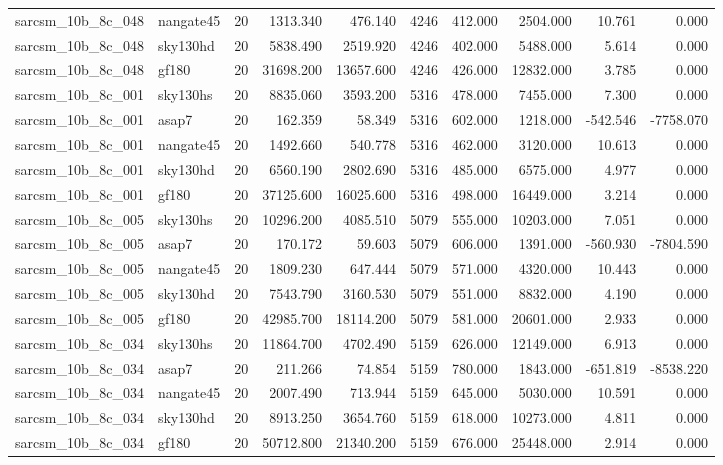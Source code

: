 \begin{longtable}{llrrrrrrrr}
sarcsm\_10b\_8c\_048 & nangate45 & 20 & 1313.340 & 476.140 & 4246 & 412.000 & 2504.000 & 10.761 & 0.000 \\
sarcsm\_10b\_8c\_048 & sky130hd & 20 & 5838.490 & 2519.920 & 4246 & 402.000 & 5488.000 & 5.614 & 0.000 \\
sarcsm\_10b\_8c\_048 & gf180 & 20 & 31698.200 & 13657.600 & 4246 & 426.000 & 12832.000 & 3.785 & 0.000 \\
sarcsm\_10b\_8c\_001 & sky130hs & 20 & 8835.060 & 3593.200 & 5316 & 478.000 & 7455.000 & 7.300 & 0.000 \\
sarcsm\_10b\_8c\_001 & asap7 & 20 & 162.359 & 58.349 & 5316 & 602.000 & 1218.000 & -542.546 & -7758.070 \\
sarcsm\_10b\_8c\_001 & nangate45 & 20 & 1492.660 & 540.778 & 5316 & 462.000 & 3120.000 & 10.613 & 0.000 \\
sarcsm\_10b\_8c\_001 & sky130hd & 20 & 6560.190 & 2802.690 & 5316 & 485.000 & 6575.000 & 4.977 & 0.000 \\
sarcsm\_10b\_8c\_001 & gf180 & 20 & 37125.600 & 16025.600 & 5316 & 498.000 & 16449.000 & 3.214 & 0.000 \\
sarcsm\_10b\_8c\_005 & sky130hs & 20 & 10296.200 & 4085.510 & 5079 & 555.000 & 10203.000 & 7.051 & 0.000 \\
sarcsm\_10b\_8c\_005 & asap7 & 20 & 170.172 & 59.603 & 5079 & 606.000 & 1391.000 & -560.930 & -7804.590 \\
sarcsm\_10b\_8c\_005 & nangate45 & 20 & 1809.230 & 647.444 & 5079 & 571.000 & 4320.000 & 10.443 & 0.000 \\
sarcsm\_10b\_8c\_005 & sky130hd & 20 & 7543.790 & 3160.530 & 5079 & 551.000 & 8832.000 & 4.190 & 0.000 \\
sarcsm\_10b\_8c\_005 & gf180 & 20 & 42985.700 & 18114.200 & 5079 & 581.000 & 20601.000 & 2.933 & 0.000 \\
sarcsm\_10b\_8c\_034 & sky130hs & 20 & 11864.700 & 4702.490 & 5159 & 626.000 & 12149.000 & 6.913 & 0.000 \\
sarcsm\_10b\_8c\_034 & asap7 & 20 & 211.266 & 74.854 & 5159 & 780.000 & 1843.000 & -651.819 & -8538.220 \\
sarcsm\_10b\_8c\_034 & nangate45 & 20 & 2007.490 & 713.944 & 5159 & 645.000 & 5030.000 & 10.591 & 0.000 \\
sarcsm\_10b\_8c\_034 & sky130hd & 20 & 8913.250 & 3654.760 & 5159 & 618.000 & 10273.000 & 4.811 & 0.000 \\
sarcsm\_10b\_8c\_034 & gf180 & 20 & 50712.800 & 21340.200 & 5159 & 676.000 & 25448.000 & 2.914 & 0.000 \\

\end{longtable}
